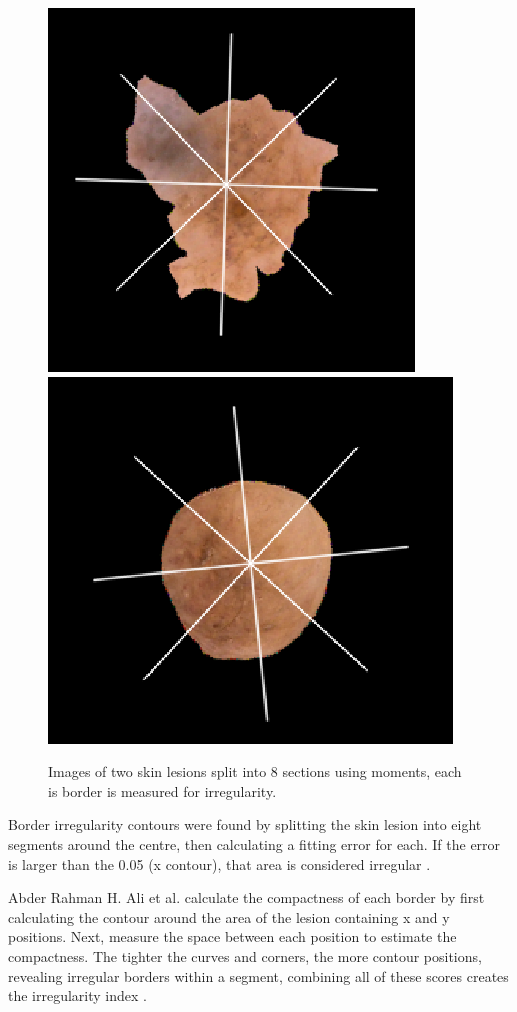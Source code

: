 \documentclass[10.5pt]{report}
\begin{document}
\begin{figure}
\centering
\includegraphics[scale=0.5]{bord1.png}
\includegraphics[scale=0.5]{bord2.png}
\caption{Images of two skin lesions split into 8 sections using moments, each is border is measured for irregularity.}
\end{figure} \label{borders}

Border irregularity contours were found by splitting the skin lesion into eight segments around the centre, then calculating a fitting error for each. If the error is larger than the 0.05 (x contour), that area is considered irregular \cite{Kasmi2016a}.

Abder Rahman H. Ali et al. calculate the compactness of each border by first calculating the contour around the area of the lesion containing x and y positions. Next, measure the space between each position to estimate the compactness. The tighter the curves and corners, the more contour positions, revealing irregular borders within a segment, combining all of these scores creates the irregularity index \cite{Zaqout2016}.
\end{document}

